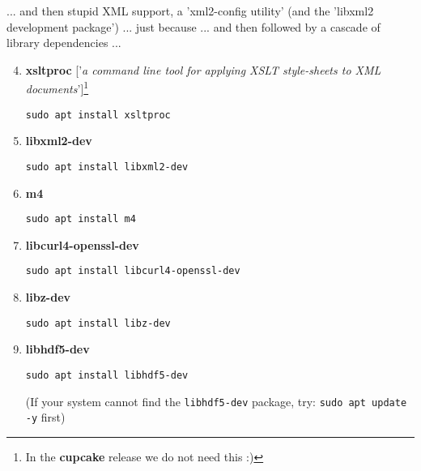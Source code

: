\documentclass[10pt,twoside]{article}
\begin{document}
... and then stupid XML support, a 'xml2-config utility' (and the 'libxml2 development package') ... just because ... and then followed by a cascade of library dependencies ...

\newpage

\begin{enumerate}[noitemsep]
\setcounter{enumi}{3}

\item \textbf{xsltproc} ['\textit{a command line tool for applying XSLT style-sheets to XML documents}']\footnote{In the \textbf{cupcake} release we do not need this :)} 
\vspace{-2pt}
\begin{verbatim}
sudo apt install xsltproc
\end{verbatim}

\vspace{2pt}
\item \textbf{libxml2-dev}
\vspace{-2pt}
\begin{verbatim}
sudo apt install libxml2-dev
\end{verbatim}

\vspace{2pt}
\item \textbf{m4}
\vspace{-2pt}
\begin{verbatim}
sudo apt install m4
\end{verbatim}

\vspace{2pt}
\item \textbf{libcurl4-openssl-dev}
\vspace{-2pt}
\begin{verbatim}
sudo apt install libcurl4-openssl-dev
\end{verbatim}

\vspace{2pt}
\item \textbf{libz-dev}
\vspace{-2pt}
\begin{verbatim}
sudo apt install libz-dev
\end{verbatim}

\vspace{2pt}
\item \textbf{libhdf5-dev}
\vspace{-2pt}
\begin{verbatim}
sudo apt install libhdf5-dev
\end{verbatim}

(If your system cannot find the \texttt{libhdf5-dev} package, try: \texttt{sudo apt update -y} first)

\end{enumerate}
\end{document}
